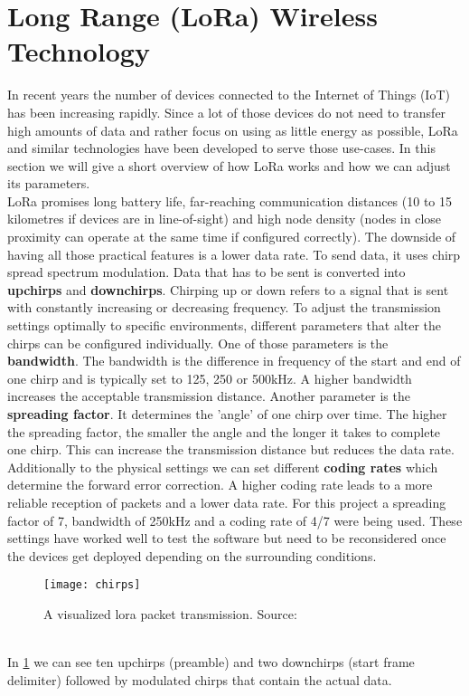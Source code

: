 \section{Long Range (LoRa) Wireless Technology}
\label{sec:lora}
In recent years the number of devices connected to the Internet of Things (IoT) has been increasing rapidly. Since a lot of those devices do not need to transfer high amounts of data and rather focus on using as little energy as possible, LoRa and similar technologies have been developed to serve those use-cases. In this section we will give a short overview of how LoRa works and how we can adjust its parameters. \\
LoRa promises long battery life, far-reaching communication distances (10 to 15 kilometres if devices are in line-of-sight) and high node density (nodes in close proximity can operate at the same time if configured correctly). The downside of having all those practical features is a lower data rate. To send data, it uses chirp spread spectrum modulation. Data that has to be sent is converted into \textbf{upchirps} and \textbf{downchirps}. Chirping up or down refers to a signal that is sent with constantly increasing or decreasing frequency. To adjust the transmission settings optimally to specific environments, different parameters that alter the chirps can be configured individually. One of those parameters is the \textbf{bandwidth}. The bandwidth is the difference in frequency of the start and end of one chirp and is typically set to 125, 250 or 500kHz. A higher bandwidth increases the acceptable transmission distance. Another parameter is the \textbf{spreading factor}. It determines the 'angle' of one chirp over time. The higher the spreading factor, the smaller the angle and the longer it takes to complete one chirp. This can increase the transmission distance but reduces the data rate. Additionally to the physical settings we can set different \textbf{coding rates} which determine the forward error correction. A higher coding rate leads to a more reliable reception of packets and a lower data rate.
For this project a spreading factor of 7, bandwidth of 250kHz and a coding rate of 4/7 were being used. These settings have worked well to test the software but need to be reconsidered once the devices get deployed depending on the surrounding conditions.
\begin{figure}
\centering
\texttt{[image: chirps]}
\caption{A visualized lora packet transmission. Source:~\cite{10.1145/3293534}}
\label{fig:chirps}
\end{figure} \\
In \cref{fig:chirps} we can see ten upchirps (preamble) and two downchirps (start frame delimiter) followed by modulated chirps that contain the actual data. 

